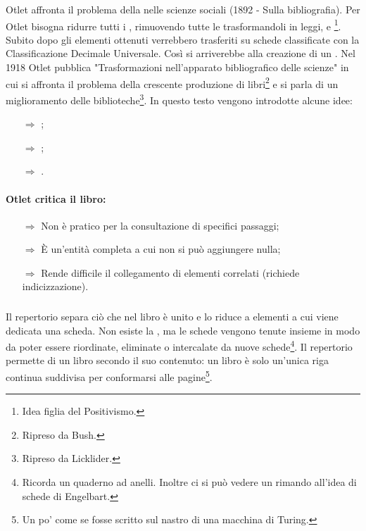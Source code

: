 Otlet affronta il problema della 
nelle scienze sociali (1892 - Sulla bibliografia).
Per Otlet bisogna ridurre tutti i , rimuovendo
tutte le  trasformandoli in leggi,  e \footnote{Idea figlia del Positivismo.}.
Subito dopo gli elementi ottenuti verrebbero trasferiti su schede classificate con la 
Classificazione Decimale Universale. Così si arriverebbe alla creazione di un .
Nel 1918 Otlet pubblica "Trasformazioni nell'apparato bibliografico delle scienze" in cui si affronta il problema
della crescente produzione di libri\footnote{Ripreso da Bush.} e si parla di un miglioramento delle biblioteche\footnote{Ripreso da Licklider.}. In
questo testo vengono introdotte alcune idee:

\begin{itemize}
    \item [$\Rightarrow$] ;
    \item [$\Rightarrow$] ;
    \item [$\Rightarrow$] .
\end{itemize}

\paragraph{Otlet critica il libro:}

\begin{itemize}
    \item [$\Rightarrow$] Non è pratico per la consultazione di specifici passaggi;
    \item [$\Rightarrow$] È un'entità completa a cui non si può aggiungere nulla;
    \item [$\Rightarrow$] Rende difficile il collegamento di elementi correlati (richiede indicizzazione).
\end{itemize}


\subsubsection{}

Il repertorio separa ciò che nel libro è unito e lo riduce a elementi
a cui viene dedicata una scheda. Non esiste la , ma
le schede vengono tenute insieme in modo da poter essere riordinate, eliminate
o intercalate da nuove schede\footnote{Ricorda un quaderno ad anelli. Inoltre ci si può vedere un rimando all'idea di schede di Engelbart.}.
Il repertorio permette di  un libro secondo il suo
contenuto: un libro è solo un'unica riga continua suddivisa per conformarsi alle pagine\footnote{Un po' come se fosse scritto sul nastro di una macchina di Turing.}.

